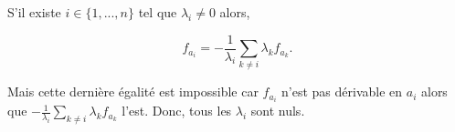 {\begin{enumerate}
{S'il existe $i\in\{1,...,n\}$ tel que $\lambda_i\neq 0$ alors,

$$f_{a_i}=-\frac{1}{\lambda_i}\sum_{k\neq i}^{}\lambda_kf_{a_k}.$$

Mais cette dernière égalité est impossible car $f_{a_i}$ n'est pas dérivable en $a_i$ alors que
$-\frac{1}{\lambda_i}\sum_{k\neq i}^{}\lambda_kf_{a_k}$ l'est. Donc, tous les $\lambda_i$ sont nuls.}
\end{enumerate}
}